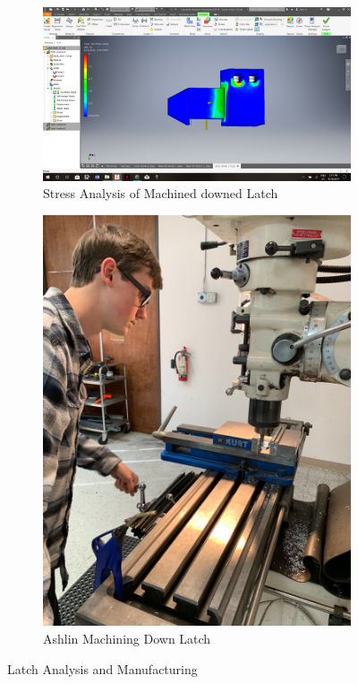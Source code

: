 \documentclass{article}
\begin{document}
\begin{figure}[h!]
\centering
\begin{subfigure}{.45\textwidth}
  \centering
  \includegraphics[width=\textwidth]{32_04-08/images/StressLatch.png}
  \caption{Stress Analysis of Machined downed Latch}
  \label{fig:StressLatch}
 \end{subfigure}
\begin{subfigure}{.25\textwidth}
  \centering
  \includegraphics[width=\textwidth]{32_04-08/images/NewLatch.jpg}
  \caption{Ashlin Machining Down Latch}
  \label{fig:MachinLatch}
  \end{subfigure}
  \caption{Latch Analysis and Manufacturing}
  \end{figure}
\end{document}
